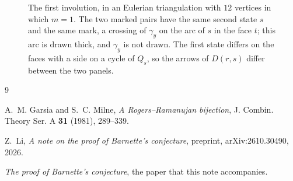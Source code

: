 \documentclass[a4paper]{amsart}
\begin{document}
\begin{figure}[tbp]
\centering

\caption{The first involution, in an Eulerian triangulation with $12$ vertices in which $m=1$. The two marked pairs have the same second state $s$ and the same mark, a crossing of $\gamma_y$ on the arc of $s$ in the face $t$; this arc is drawn thick, and $\gamma_y$ is not drawn. The first state differs on the faces with a side on a cycle of $Q_s$, so the arrows of $D(r,s)$ differ between the two panels.}
\label{fig:first}
\end{figure}

\begin{thebibliography}{9}

A.~M. Garsia and S.~C. Milne, \emph{A Rogers--Ramanujan bijection}, J. Combin. Theory Ser. A \textbf{31} (1981), 289--339.

Z.~Li, \emph{A note on the proof of Barnette's conjecture}, preprint, arXiv:2610.30490, 2026.

\emph{The proof of Barnette's conjecture}, the paper that this note accompanies.

\end{thebibliography}
\end{document}
